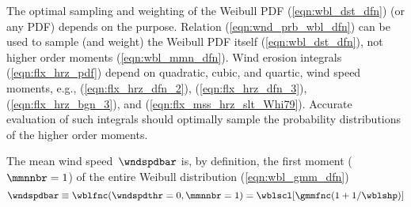 \documentclass[12pt,twoside]{book}
\begin{document}
The optimal sampling and weighting of the Weibull PDF
(\ref{eqn:wbl_dst_dfn}) (or any PDF) depends on the purpose.
Relation (\ref{eqn:wnd_prb_wbl_dfn}) can be used to sample (and weight)
the Weibull PDF itself (\ref{eqn:wbl_dst_dfn}), not higher order
moments (\ref{eqn:wbl_mmn_dfn}).
Wind erosion integrals (\ref{eqn:flx_hrz_pdf}) depend on quadratic,
cubic, and quartic, wind speed moments, e.g.,
(\ref{eqn:flx_hrz_dfn_2}), (\ref{eqn:flx_hrz_dfn_3}),
(\ref{eqn:flx_hrz_bgn_3}), and (\ref{eqn:flx_mss_hrz_slt_Whi79}).  
Accurate evaluation of such integrals should optimally sample the
probability distributions of the higher order moments. 

The mean wind speed~$\wndspdbar$ is, by definition, the first moment
($\mmnnbr = 1$) of the entire Weibull distribution
(\ref{eqn:wbl_gmm_dfn}) 
\begin{equation}
\wndspdbar \equiv \wblfnc(\wndspdthr = 0,\mmnnbr = 1) = \wblscl [\gmmfnc (1 + 1/\wblshp)]
\label{eqn:wnd_spd_avg_wbl_dfn}
\end{equation}
\end{document}
